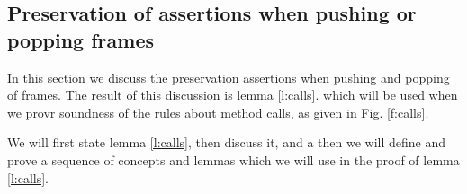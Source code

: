 \subsection{Preservation of assertions when pushing or popping frames}

In this section we  discuss the preservation  assertions when pushing and popping of frames. 
The result of this discussion is  lemma \ref{l:calls}. 
 which will be used when we provr soundness of the rules about method calls, as given in Fig. \ref{f:calls}. 

We will first state  lemma \ref{l:calls}, then discuss it, and a then we will define and prove a sequence of concepts and 
 lemmas which we will use in the proof of lemma \ref{l:calls}.

